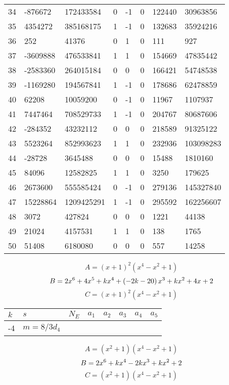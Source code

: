 \documentclass{amsart}
\begin{document}
\begin{longtable}{|l|l|l|lllll|}
34&-876672&172433584&0&-1&0&122440&30963856\\
35&4354272&385168175&1&-1&0&132683&35924216\\
36&252&41376&0&1&0&111&927\\
37&-3609888&476533841&1&1&0&154669&47835442\\
38&-2583360&264015184&0&0&0&166421&54748538\\
39&-1169280&194567841&1&-1&0&178686&62478859\\
40&62208&10059200&0&-1&0&11967&1107937\\
41&7447464&708529733&1&-1&0&204767&80687606\\
42&-284352&43232112&0&0&0&218589&91325122\\
43&5523264&852993623&1&1&0&232936&103098283\\
44&-28728&3645488&0&0&0&15488&1810160\\
45&84096&12582825&1&1&0&3250&179625\\
46&2673600&555585424&0&-1&0&279136&145327840\\
47&15228864&1209425291&1&-1&0&295592&162256607\\
48&3072&427824&0&0&0&1221&44138\\
49&21024&4157531&1&1&0&138&1765\\
50&51408&6180080&0&0&0&557&14258\\
\hline
\end{longtable}
$$A=(x
 + 1)^{2}(x^4
 - x^2
 + 1)$$
$$B=2\*x^6
 + 4\*x^5
 + k\*x^4
 + \left(-2\*k
 - 20\right) \*x^3
 + k\*x^2
 + 4\*x
 + 2$$
$$C=(x
 + 1)^{2}(x^4
 - x^2
 + 1)$$
\begin{longtable}{|l|l|l|lllll|}
\hline
$k$ & $s$ & $N_E$ & $a_1$ & $a_2$ & $a_3$ & $a_4$ & $a_5$\\
\hline
-4&$m=8/3d_{4}$&&\multicolumn{5}{c|}{}\\
\hline
\end{longtable}
$$A=(x^2
 + 1)(x^4
 - x^2
 + 1)$$
$$B=2\*x^6
 + k\*x^4
 - 2\*k\*x^3
 + k\*x^2
 + 2$$
$$C=(x^2
 + 1)(x^4
 - x^2
 + 1)$$
\end{document}
